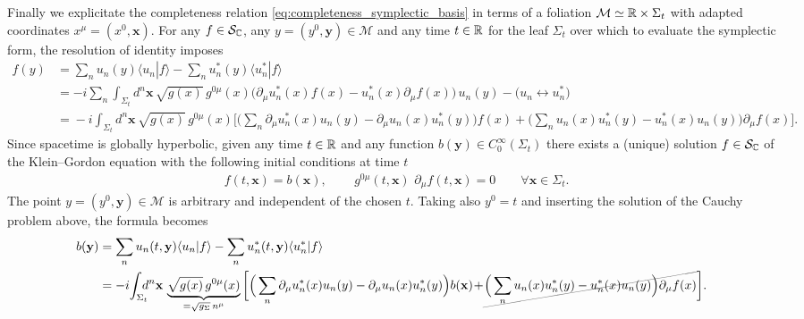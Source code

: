 \documentclass[../QFT_main.tex]{subfiles}
\begin{document}
\begin{mytheorem}
Finally we explicitate the completeness relation \eqref{eq:completeness_symplectic_basis} in terms of a foliation $\mathcal{M}\simeq \mathbb{R}\times \Sigma_t$ with adapted coordinates $x^\mu=(x^0,\mathbf{x})$.
For any $f\in \mathcal{S}_{\mathbb{C}}$, any $y=(y^0,\mathbf{y})\in \mathcal{M}$ and any time $t\in\mathbb{R}$ for the leaf $\Sigma_t$ over which to evaluate the symplectic form, the resolution of identity imposes
{\small
\begin{align}
  f(y) &= \sum_n u_n(y) \langle u_n| f \rangle - \sum_n u_n^*(y) \langle u_n^*|f \rangle\\
  &= -i \sum_n  \int_{\Sigma_t} \!\!d^n\mathbf{x}\, \sqrt{g(x)}\, g^{0\mu}(x) \Big( \partial_\mu u_n^*(x) f(x) - u_n^*(x) \partial_\mu f(x)\Big)\, u_n(y) - \big(u_n \leftrightarrow u_n^*\big)\\ 
  &= \!-i \int_{\Sigma_t} \!\!\!\!d^n\mathbf{x}\, \sqrt{g(x)}\, g^{0\mu}(x) \bigg[\!\Big( \sum_n \partial_\mu u_n^*(x) u_n(y)-\partial_\mu u_n(x) u_n^*(y) \Big) f(x)
  + \!\Big( \sum_n u_n(x) u_n^*(y) \!-\! u_n^*(x) u_n(y)\Big) \partial_\mu f(x)\bigg].
\end{align}}
Since spacetime is globally hyperbolic, given any time $t\in\mathbb{R}$ and any function $b(\mathbf{y})\in C^\infty_0(\Sigma_t)$ there exists a (unique) solution $f\in \mathcal{S}_{\mathbb{C}}$ of the Klein--Gordon equation with the following initial conditions at time $t$
\begin{align}
  &f(t,\mathbf{x}) = b(\mathbf{x}),\qquad
  \,g^{0\mu}(t,\mathbf{x}) \,\,\partial_\mu f(t,\mathbf{x}) = 0 \qquad \forall \mathbf{x}\in \Sigma_t.
\end{align} 
The point $y=(y^0,\mathbf{y})\in\mathcal{M}$ is arbitrary and independent of the chosen $t$.
Taking also $y^0=t$ and inserting the solution of the Cauchy problem above, the formula becomes
{\small
\begin{align}
  b(\mathbf{y}) &= \sum_n u_n(t,\mathbf{y}) \langle u_n| f \rangle - \sum_n u_n^*(t,\mathbf{y}) \langle u_n^*|f \rangle\\
  &= -i\! \int_{\Sigma_{t}}\!\! \!\!d^n\mathbf{x}\,\underbrace{ \sqrt{g(x)}\, g^{0\mu}(x)}_{=\sqrt{g_{\Sigma}}\, n^\mu} \bigg[\Big( \sum_n \partial_\mu u_n^*(x) u_n(y)-\partial_\mu u_n(x) u_n^*(y) \Big) b(\mathbf{x})
  \!+\! \graycancel{\Big( \sum_n u_n(x) u_n^*(y) - u_n^*(x) u_n(y)\Big) \partial_\mu f(x)}\bigg].
\end{align}}
\vspace{-5mm}


\end{mytheorem}
\end{document}
